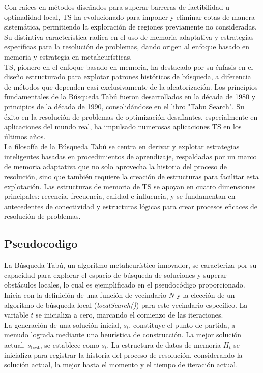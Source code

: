 \documentclass[spanish,12pt,letterpaper]{article}
\begin{document}
	Con raíces en métodos diseñados para superar barreras de factibilidad u optimalidad local, TS ha evolucionado para imponer y eliminar cotas de manera sistemática, permitiendo la exploración de regiones previamente no consideradas. Su distintiva característica radica en el uso de memoria adaptativa y estrategias específicas para la resolución de problemas, dando origen al enfoque basado en memoria y estrategia en metaheurísticas.\\
	
	TS, pionero en el enfoque basado en memoria, ha destacado por su énfasis en el diseño estructurado para explotar patrones históricos de búsqueda, a diferencia de métodos que dependen casi exclusivamente de la aleatorización. Los principios fundamentales de la Búsqueda Tabú fueron desarrollados en la década de 1980 y principios de la década de 1990, consolidándose en el libro "Tabu Search". Su éxito en la resolución de problemas de optimización desafiantes, especialmente en aplicaciones del mundo real, ha impulsado numerosas aplicaciones TS en los últimos años.\\
	
	La filosofía de la Búsqueda Tabú se centra en derivar y explotar estrategias inteligentes basadas en procedimientos de aprendizaje, respaldadas por un marco de memoria adaptativa que no solo aprovecha la historia del proceso de resolución, sino que también requiere la creación de estructuras para facilitar esta explotación. Las estructuras de memoria de TS se apoyan en cuatro dimensiones principales: recencia, frecuencia, calidad e influencia, y se fundamentan en antecedentes de conectividad y estructuras lógicas para crear procesos eficaces de resolución de problemas.
	
	\subsection{Pseudocodigo}
	La Búsqueda Tabú, un algoritmo metaheurístico innovador, se caracteriza por su capacidad para explorar el espacio de búsqueda de soluciones y superar obstáculos locales, lo cual es ejemplificado en el pseudocódigo proporcionado. Inicia con la definición de una función de vecindario \(N\) y la elección de un algoritmo de búsqueda local (\textit{localSearch()}) para este vecindario específico. La variable \(t\) se inicializa a cero, marcando el comienzo de las iteraciones.\\
	
	La generación de una solución inicial, \(s_t\), constituye el punto de partida, a menudo lograda mediante una heurística de construcción. La mejor solución actual, \(s_{\text{best}}\), se establece como \(s_t\). La estructura de datos de memoria \(H_t\) se inicializa para registrar la historia del proceso de resolución, considerando la solución actual, la mejor hasta el momento y el tiempo de iteración actual.\\
	
\end{document}
